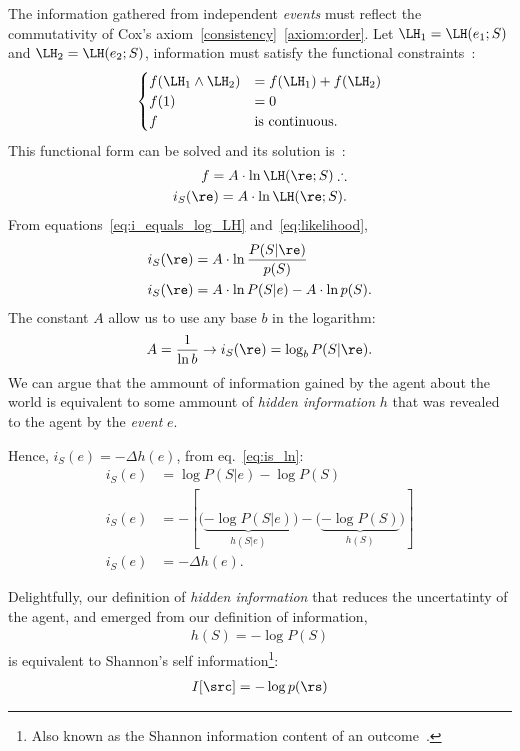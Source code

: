 The information gathered from independent \emph{events} must reflect the commutativity of Cox's axiom~\ref{consistency}~\ref{axiom:order}. Let \(\LH_1 = \LH (e_1; S)\) and \(\LH_2 = \LH (e_2; S)\), information must satisfy the functional constraints~\cite{sowinski:2016}:
\[
\begin{cases}
	f(\LH_1 \land \LH_2) &= f(\LH_1) + f(\LH_2)\\
	f(1) &= 0\\
	f &\text{is continuous.}
\end{cases}
\]
This functional form can be solved and its solution is~\cite{caticha:2008}:
\begin{align}
	f = A \cdot \ln{\LH(\re; S)} \therefore \nonumber\\
	i_S(\re) = A \cdot \ln{\LH(\re; S)}.\label{eq:i_equals_log_LH}
\end{align}
From equations~\ref{eq:i_equals_log_LH} and~\ref{eq:likelihood},
\begin{align}
	i_S(\re) &= A \cdot \ln{ \frac{P(S | \re )}{p(S)}}\\
	i_S(\re) &= A \cdot \ln{ P(S|e )} - A \cdot \ln{p(S)}.
\label{eq:is_ln} \end{align}
The constant \(A\) allow us to use any base \(b\) in the logarithm:
\begin{align}
	A = \frac {1}{\ln b} \to i_S(\re) = \log_b P(S|\re ).
\end{align}
We can argue that the ammount of information gained by the agent about the world is equivalent to some ammount of \emph{hidden information} \(h\) that was revealed to the agent by the \emph{event} \(e\).

Hence, \(i_S(e)=-\Delta h(e)\), from eq.~\ref{eq:is_ln}:
\begin{align}
	i_S(e) &= \log{ P(S|e )} - \log {P(S)} \\
	i_S(e) &= - \left[ \biggl(\underbrace{-\log{P(S|e )}}_{h(S|e )}\biggr) - \biggl(\underbrace{-\log{P(S)}}_{h(S)}\biggr) \right] \\
	i_S(e)&=-\Delta h(e).
\end{align}

Delightfully, our definition of \emph{hidden information} that reduces the uncertatinty of the agent, and emerged from our definition of information,
\begin{align}
	h (S) = - \log P(S)
\end{align}
is equivalent to Shannon's self information\footnote{Also known as the Shannon information content of an outcome~\cite{mackay:2002}.}:
\begin{align}
	I[\src] = - \log p(\rs)
\end{align}

